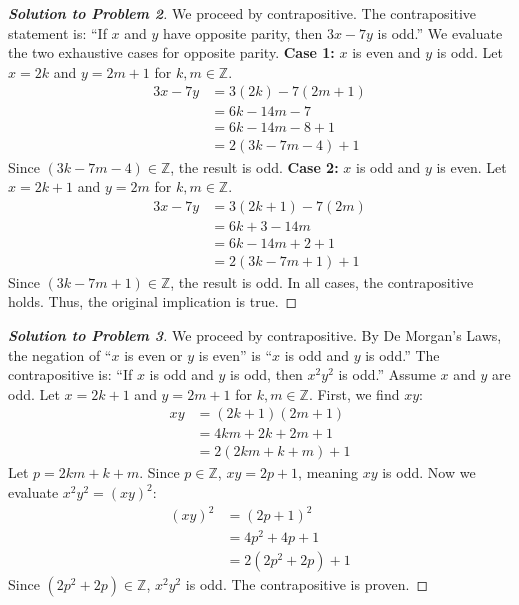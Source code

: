 \documentclass[11pt]{article}
\begin{document}
\begin{proof}[\textbf{Solution to Problem 2}]
We proceed by contrapositive. The contrapositive statement is: ``If $x$ and $y$ have opposite parity, then $3x - 7y$ is odd.''
We evaluate the two exhaustive cases for opposite parity.
\textbf{Case 1:} $x$ is even and $y$ is odd. Let $x = 2k$ and $y = 2m + 1$ for $k, m \in \mathbb{Z}$.
\begin{align*}
3x - 7y &= 3(2k) - 7(2m + 1) \\
&= 6k - 14m - 7 \\
&= 6k - 14m - 8 + 1 \\
&= 2(3k - 7m - 4) + 1
\end{align*}
Since $(3k - 7m - 4) \in \mathbb{Z}$, the result is odd.
\textbf{Case 2:} $x$ is odd and $y$ is even. Let $x = 2k + 1$ and $y = 2m$ for $k, m \in \mathbb{Z}$.
\begin{align*}
3x - 7y &= 3(2k + 1) - 7(2m) \\
&= 6k + 3 - 14m \\
&= 6k - 14m + 2 + 1 \\
&= 2(3k - 7m + 1) + 1
\end{align*}
Since $(3k - 7m + 1) \in \mathbb{Z}$, the result is odd.
In all cases, the contrapositive holds. Thus, the original implication is true.
\end{proof}

\begin{proof}[\textbf{Solution to Problem 3}]
We proceed by contrapositive. By De Morgan's Laws, the negation of ``$x$ is even or $y$ is even'' is ``$x$ is odd and $y$ is odd.'' The contrapositive is: ``If $x$ is odd and $y$ is odd, then $x^2 y^2$ is odd.''
Assume $x$ and $y$ are odd. Let $x = 2k + 1$ and $y = 2m + 1$ for $k, m \in \mathbb{Z}$.
First, we find $xy$:
\begin{align*}
xy &= (2k + 1)(2m + 1) \\
&= 4km + 2k + 2m + 1 \\
&= 2(2km + k + m) + 1
\end{align*}
Let $p = 2km + k + m$. Since $p \in \mathbb{Z}$, $xy = 2p + 1$, meaning $xy$ is odd.
Now we evaluate $x^2 y^2 = (xy)^2$:
\begin{align*}
(xy)^2 &= (2p + 1)^2 \\
&= 4p^2 + 4p + 1 \\
&= 2(2p^2 + 2p) + 1
\end{align*}
Since $(2p^2 + 2p) \in \mathbb{Z}$, $x^2 y^2$ is odd. The contrapositive is proven.
\end{proof}
\end{document}
